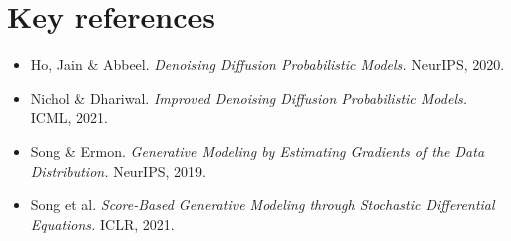 \documentclass[11pt]{article}
\begin{document}
\section*{Key references}
\begin{itemize}
    \item Ho, Jain \& Abbeel. \textit{Denoising Diffusion Probabilistic
          Models.} NeurIPS, 2020.
    \item Nichol \& Dhariwal. \textit{Improved Denoising Diffusion
          Probabilistic Models.} ICML, 2021.
    \item Song \& Ermon. \textit{Generative Modeling by Estimating Gradients
          of the Data Distribution.} NeurIPS, 2019.
    \item Song et al. \textit{Score-Based Generative Modeling through
          Stochastic Differential Equations.} ICLR, 2021.
\end{itemize}
\end{document}
